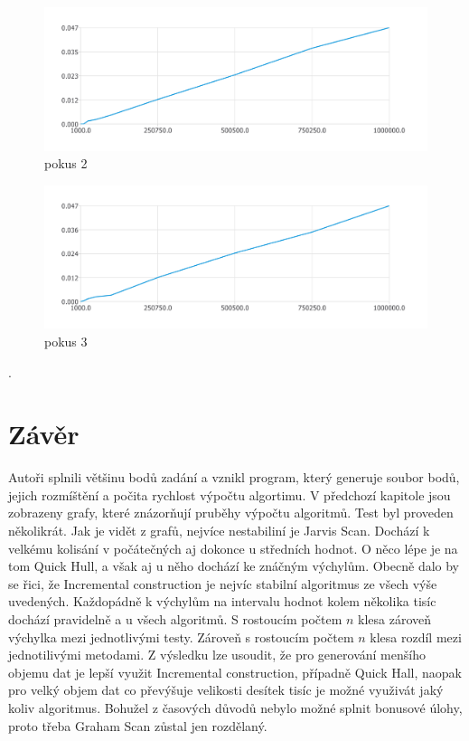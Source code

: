 \documentclass{article}
\begin{document}
\begin{figure}[htbp]
\centering
        \includegraphics[clip, trim=0cm 0cm 0cm 0cm, width=1\textwidth]{pdf26.pdf}
        \caption{pokus 2}
\end{figure}
\begin{figure}[htbp]
\centering
        \includegraphics[clip, trim=0cm 0cm 0cm 0cm, width=1\textwidth]{pdf27.pdf}
        \caption{pokus 3}
\end{figure}
.\\
\bigskip
\clearpage
\section{Závěr}
\indent Autoři splnili většinu bodů zadání a vznikl program, který generuje soubor bodů, jejich rozmíštění a počita rychlost výpočtu algortimu.
V předchozí kapitole jsou zobrazeny grafy, které znázorňují pruběhy výpočtu algoritmů. Test byl proveden několikrát. Jak je vidět z grafů, nejvíce nestabiliní je Jarvis Scan. Dochází k velkému kolisání v počátečných aj dokonce u středních hodnot. O něco lépe je na tom Quick Hull, a však aj u něho dochází ke znáčným výchylům. Obecně dalo by se řici, že Incremental construction je nejvíc stabilní algoritmus ze všech výše uvedených.
\bigskip
Každopádně k výchylům na intervalu hodnot kolem několika tisíc dochází pravidelně a u všech algoritmů. S rostoucím počtem $n$ klesa zároveň výchylka mezi jednotlivými testy. Zároveň s rostoucím počtem $n$ klesa rozdíl mezi jednotilivými metodami. 
\bigskip
Z výsledku lze usoudit, že pro generování menšího objemu dat je lepší využit Incremental construction, případně Quick Hall, naopak pro velký objem dat co převýšuje velikosti desítek tisíc je možné využivát jaký koliv algoritmus.
Bohužel z časových důvodů nebylo možné splnit bonusové úlohy, proto třeba Graham Scan zůstal jen rozdělaný.
\end{document}
